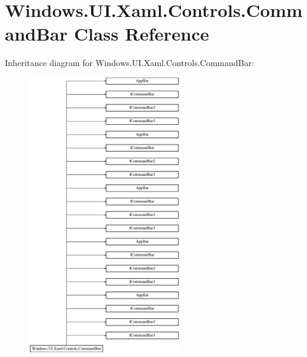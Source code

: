 \hypertarget{class_windows_1_1_u_i_1_1_xaml_1_1_controls_1_1_command_bar}{}\section{Windows.\+U\+I.\+Xaml.\+Controls.\+Command\+Bar Class Reference}
\label{class_windows_1_1_u_i_1_1_xaml_1_1_controls_1_1_command_bar}
Inheritance diagram for Windows.\+U\+I.\+Xaml.\+Controls.\+Command\+Bar\+:\begin{figure}[H]
\begin{center}
\leavevmode
\includegraphics[height=12.000000cm]{class_windows_1_1_u_i_1_1_xaml_1_1_controls_1_1_command_bar}
\end{center}
\end{figure}
